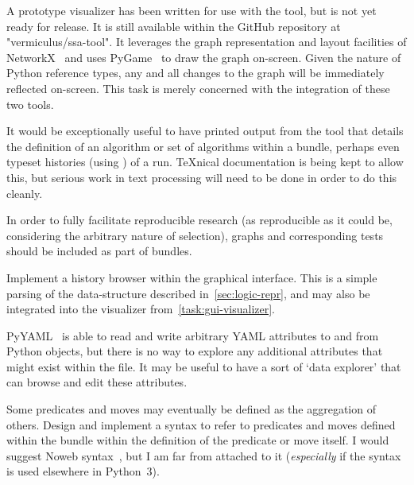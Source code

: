 \begin{task}
  \label{task:gui-visualizer}
  A prototype visualizer has been written for use with the tool,
    but is not yet ready for release.
  It is still available within the GitHub repository at "vermiculus/ssa-tool".
  It leverages the graph representation and layout facilities of NetworkX~\autocite{hagberg:networkx}
    and uses PyGame~\autocite{pygame} to draw the graph on-screen.
  Given the nature of Python reference types, any and all changes to the graph
    will be immediately reflected on-screen.
  This task is merely concerned with the integration of these two tools.
\end{task}

\begin{task}
  \label{task:texport}
  It would be exceptionally useful to have printed output from the
  tool that details the definition of an algorithm or set of
  algorithms within a bundle, perhaps even typeset histories (using
  \TikZ) of a run.  \TeX nical documentation is being kept to allow
  this, but serious work in text processing will need to be done in
  order to do this cleanly.
\end{task}

\begin{task}
  \label{task:bundle-graphs}
  In order to fully facilitate reproducible research
    (as reproducible as it could be,
      considering the arbitrary nature of selection),
    graphs and corresponding tests should be included as part of bundles.
\end{task}

\begin{task}
  \label{task:save-history}
  Implement a history browser within the graphical interface.
  This is a simple parsing of the data-structure described in~\autoref{sec:logic-repr},
    and may also be integrated into the visualizer from~\autoref{task:gui-visualizer}.
\end{task}

\begin{task}
  \label{task:arbitrary-attributes}
  PyYAML~\autocite{pyyaml} is able to read and write arbitrary YAML
  attributes to and from Python objects, but there is no way to explore
  any additional attributes that might exist within the file.
  It may be useful to have a sort of \enquote*{data explorer} that can
    browse and edit these attributes.
\end{task}

\begin{task}
  \label{task:magical-references}
  Some predicates and moves may eventually be defined as the aggregation of others.
  Design and implement a syntax to refer to predicates and moves defined within the bundle
    within the definition of the predicate or move itself.
  I would suggest Noweb syntax~\autocite{noweb}, but I am far from attached to it
    (\emph{especially} if the syntax is used elsewhere in Python~3).
\end{task}


